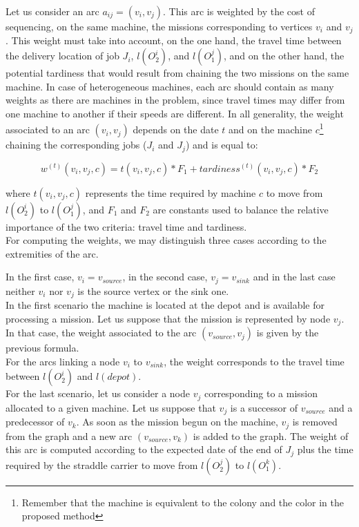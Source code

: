 \documentclass[review]{elsarticle}
\begin{document}
Let us consider an arc $a_{ij}=(v_i,v_j)$. This arc is weighted by the cost of sequencing, on the same machine, the missions corresponding to vertices $v_i$ and $v_j$. This weight must take into account, on the one hand, the travel time between the delivery location of job $J_i$, $l(O_2^i)$, and $l(O_1^j)$, and on the other hand, the potential tardiness that would result from chaining the two missions on the same machine. In case of heterogeneous machines, each arc should contain as many weights as there are machines in the problem, since travel times may differ from one machine to another if their speeds are different. In all generality, the weight associated to an arc $(v_i,v_j)$ depends on the date $t$ and on the machine $c$\footnote{Remember that the machine is equivalent to the colony and the color in the proposed method} chaining the corresponding jobs ($J_i$ and $J_j$) and is equal to:

\begin{equation*}
  w^{(t)}(v_i,v_j,c) = t(v_i,v_j,c)*F_1 + tardiness^{(t)}(v_i,v_j,c)*F_2
\end{equation*}

where $t(v_i,v_j,c)$ represents the time required by machine $c$ to move from $l(O_2^i)$ to $l(O_1^j)$, and $F_1$ and $F_2$ are constants used to balance the relative importance of the two criteria: travel time and tardiness.\\

For computing the weights, we may distinguish three cases according to the extremities of the arc.

In the first case, $v_i = v_{source}$, in the second case, $v_j = v_{sink}$ and in the last case neither $v_i$ nor $v_j$ is the source vertex or the sink one.\\

In the first scenario the machine is located at the depot  and is available for processing a mission. Let us suppose that the mission is represented by node $v_j$. In that case, the weight associated to the arc $(v_{source},v_j)$ is given by the previous formula.\\

For the arcs linking a node $v_i$ to $v_{sink}$, the weight corresponds to the travel time between $l(O_2^i)$ and $l(depot)$.\\

For the last scenario, let us consider a node $v_j$ corresponding to a mission allocated to a given machine. Let us suppose that $v_j$ is a successor of $v_{source}$ and a predecessor of $v_k$. As soon as the mission begun on the machine, $v_j$ is removed from the graph and a new arc $(v_{source},v_k)$ is added to the graph. The weight of this arc is computed according to the expected date of the end of $J_j$ plus the time required by the straddle carrier to move from $l(O_2^j)$ to $l(O_1^k)$. 
\end{document}
